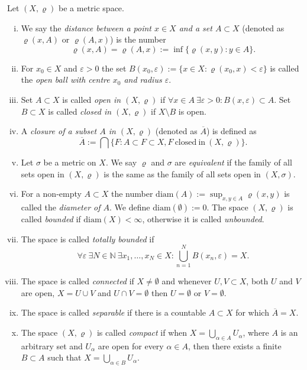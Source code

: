 \begin{define}\label{def:allprp}
Let $(X,\varrho)$ be a metric space.
\begin{enumerate}[(i)]
	\item We say the \emph{distance between a point $x\in X$ and a set $A\subset X$} (denoted as $\varrho(x,A)$ or $\varrho(A,x)$) is the number
\[
	 \varrho(x,A) = \varrho(A,x) := \inf\{\varrho(x,y): y\in A\}.
\]
	\item For $x_0\in X$ and $\varepsilon > 0$ the set $B(x_0,\varepsilon):=\{x\in X : \varrho(x_0,x)<\varepsilon\}$ is called the \emph{open ball with centre $x_0$ and radius $\varepsilon$}.
	\item Set $A\subset X$ is called \emph{open in $(X,\varrho)$} if $\forall x\in A\ \exists \varepsilon>0: B(x,\varepsilon)\subset A$. Set $B\subset X$ is called \emph{closed in $(X,\varrho)$} if $X\setminus B$ is open.
	\item A \emph{closure of a subset $A$ in $(X, \varrho)$} (denoted as $\overline{A}$) is defined as
\[
	\overline{A}:= \bigcap\{F: A\subset F\subset X, F\ \mathrm{closed\ in}\ (X, \varrho)\}.
\]
	\item Let $\sigma$ be a metric on $X$. We say $\varrho$ and $\sigma$ are \emph{equivalent} if the family of all sets open in $(X,\varrho)$ is the same as the family of all sets open in $(X,\sigma)$.
	\item For a non-empty $A\subset X$ the number $\mathrm{diam}(A):=\sup_{x,y\in A}\varrho(x,y)$ is called the \emph{diameter of $A$}. We define $\mathrm{diam}(\emptyset):=0$. The space $(X,\varrho)$ is called \emph{bounded} if $\mathrm{diam}(X)<\infty$, otherwise it is called \emph{unbounded}.
	\item The space is called \emph{totally bounded} if
\[
	\forall \varepsilon\ \exists N \in \mathbb{N}\ \exists x_1, \dots, x_N \in X: \bigcup_{n=1}^N B(x_n, \varepsilon) = X.
\]
	\item The space is called \emph{connected} if $X\ne\emptyset$ and whenever $U,V\subset X$, both $U$ and $V$ are open, $X=U\cup V$ and $U\cap V=\emptyset$ then $U=\emptyset$ or $V=\emptyset$.
	\item The space is called \emph{separable} if there is a countable $A\subset X$ for which $\overline{A} =X$.
	\item The space $(X,\varrho)$ is called \emph{compact} if when $X=\bigcup_{\alpha\in A} U_\alpha$, where $A$ is an arbitrary set and $U_\alpha$ are open for every $\alpha\in A$, then there exists a finite $B\subset A$ such that $X=\bigcup_{\alpha\in B} U_\alpha$.

\end{enumerate}
\end{define}

